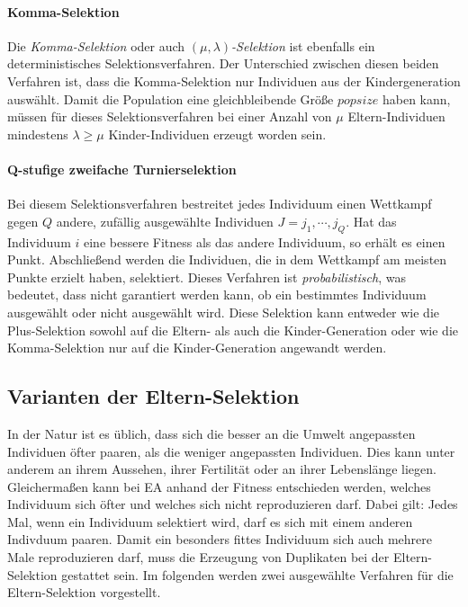 \paragraph{Komma-Selektion}
Die \textit{Komma-Selektion} oder auch $(\mu, \lambda)$\textit{-Selektion} ist ebenfalls ein deterministisches Selektionsverfahren. Der Unterschied zwischen diesen beiden Verfahren ist, dass die Komma-Selektion nur Individuen aus der Kindergeneration auswählt. Damit die Population eine gleichbleibende Größe $popsize$ haben kann, müssen für dieses Selektionsverfahren bei einer Anzahl von $\mu$ Eltern-Individuen mindestens $\lambda \ge \mu$ Kinder-Individuen erzeugt worden sein. 

\paragraph{Q-stufige zweifache Turnierselektion}
Bei diesem Selektionsverfahren bestreitet jedes Individuum einen Wettkampf gegen $Q$ andere, zufällig ausgewählte Individuen $J = {j_1, \cdots, j_Q}$. Hat das Individuum $i$ eine bessere Fitness als das andere Individuum, so erhält es einen Punkt. Abschließend werden die Individuen, die in dem Wettkampf am meisten Punkte erzielt haben, selektiert. Dieses Verfahren ist \textit{probabilistisch}, was bedeutet, dass nicht garantiert werden kann, ob ein bestimmtes Individuum ausgewählt oder nicht ausgewählt wird. Diese Selektion kann entweder wie die Plus-Selektion sowohl auf die Eltern- als auch die Kinder-Generation oder wie die Komma-Selektion nur auf die Kinder-Generation angewandt werden. 

\subsection{Varianten der Eltern-Selektion}
In der Natur ist es üblich, dass sich die besser an die Umwelt angepassten Individuen öfter paaren, als die weniger angepassten Individuen. Dies kann unter anderem an ihrem Aussehen, ihrer Fertilität oder an ihrer Lebenslänge liegen. Gleichermaßen kann bei \acs{EA} anhand der Fitness entschieden werden, welches Individuum sich öfter und welches sich nicht reproduzieren darf. Dabei gilt: Jedes Mal, wenn ein Individuum selektiert wird, darf es sich mit einem anderen Indivduum paaren. Damit ein besonders fittes Individuum sich auch mehrere Male reproduzieren darf, muss die Erzeugung von Duplikaten bei der Eltern-Selektion gestattet sein. Im folgenden werden zwei ausgewählte Verfahren für die Eltern-Selektion vorgestellt. 

